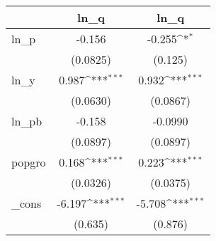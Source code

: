 {
\def\sym#1{\ifmmode^{#1}\else\(^{#1}\)\fi}
\begin{tabular}{l*{2}{c}}
\hline\hline
            &\multicolumn{1}{c}{ln\_q}&\multicolumn{1}{c}{ln\_q}\\
\hline
ln\_p        &      -0.156         &      -0.255\sym{*}  \\
            &    (0.0825)         &     (0.125)         \\
[1em]
ln\_y        &       0.987\sym{***}&       0.932\sym{***}\\
            &    (0.0630)         &    (0.0867)         \\
[1em]
ln\_pb       &      -0.158         &     -0.0990         \\
            &    (0.0897)         &    (0.0897)         \\
[1em]
popgro      &       0.168\sym{***}&       0.223\sym{***}\\
            &    (0.0326)         &    (0.0375)         \\
[1em]
\_cons      &      -6.197\sym{***}&      -5.708\sym{***}\\
            &     (0.635)         &     (0.876)         \\
\hline\hline
\end{tabular}
}

